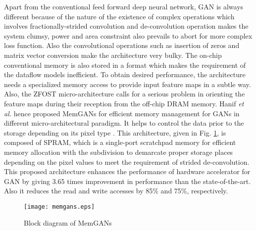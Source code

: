 \documentclass[journal]{IEEEtran}
\begin{document}
\par Apart from the conventional feed forward deep neural network, GAN is always different because of the nature of the existence of complex operations which involves fractionally-strided convolution and de-convolution operation makes the system clumsy, power and area constraint also prevails to abort for more complex loss function. Also the convolutional operations such as insertion of zeros and matrix vector conversion make the architecture very bulky. The on-chip conventional memory is also stored in a format which makes the requirement of the dataflow models inefficient. To obtain desired performance, the architecture needs a specialized memory access to provide input feature maps in a subtle way. Also, the ZFOST micro-architecture calls for a serious problem in orienting the feature maps during their reception from the off-chip DRAM memory. Hanif \textit{et al.} hence proposed MemGANs for efficient memory management for GANs in different micro-architectural paradigm. It helps to control the data prior to the storage depending on its pixel type \cite{paper38}. This architecture, given in Fig. \ref{fig:mem}, is composed of SPRAM, which is a single-port scratchpad memory for efficient memory allocation with the subdivision to demarcate proper storage places depending on the pixel values to meet the requirement of strided de-convolution. This proposed architecture enhances the performance of hardware accelerator for GAN by giving 3.65 times improvement in performance than the state-of-the-art. Also it reduces the read and write accesses by 85\% and 75\%, respectively. 

\begin{figure}[b]
    \centering
    \texttt{[image: memgans.eps]}
    \caption{Block diagram of MemGANs \cite{paper38}}
    \label{fig:mem}
\end{figure}
\end{document}
